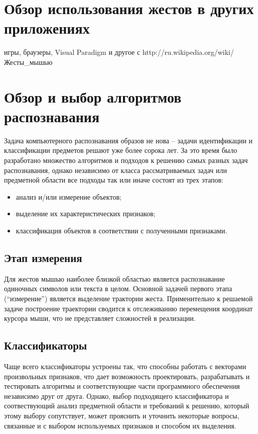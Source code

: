 \documentclass[a5paper]{article}
\begin{document}
\section{Обзор использования жестов в других приложениях}

игры, браузеры, Visual Paradigm и другое с http://ru.wikipedia.org/wiki/Жесты\_мышью

\section{Обзор и выбор алгоритмов распознавания}
Задача компьютерного распознавания образов не нова -- задачи идентификации и классификации предметов решают уже более сорока лет. За это 
время было разработано множество алгоритмов и подходов к решению самых разных задач распознавания, однако независимо от класса 
рассматриваемых задач или предметной области все подходы так или иначе состоят из трех этапов: 
\begin{itemize}
  \item анализ и/или измерение объектов;
  \item выделение их характеристических признаков;
  \item классификация объектов в соответствии с полученными признаками.
\end{itemize}

\subsection{Этап измерения}
Для жестов мышью наиболее близкой областью является распознавание одиночных символов или текста в целом. Основной задачей первого этапа 
(``измерение'') является выделение трактории жеста. Применительно к решаемой задаче построение траектории сводится к отслеживанию 
перемещения координат курсора мыши, что не представляет сложностей в реализации. 

\subsection{Классификаторы}

Чаще всего классификаторы устроены так, что способны работать с векторами произвольных признаков, что дает возможность
проектировать, разрабатывать и тестировать алгоритмы и соответствующие части программного обеспечения независимо друг от друга. Однако, 
выбор подходящего классификатора и соотвествующий анализ предметной области и требований к решению, который этому выбору сопутствует, 
может прояснить и уточнить некоторые вопросы, связанные и с выбором используемых признаков и способом их выделения. 
\end{document}
